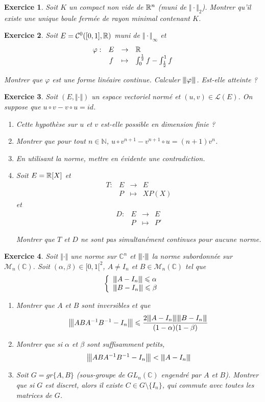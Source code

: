 \documentclass[12pt]{article}
\newtheorem{exercise}{Exercice}[section]
\theoremstyle{remark}
\theoremstyle{remark}
\newcommand{\C}{\mathbb{C}} \newcommand{\Q}{\mathbb{Q}}
\newcommand{\N}{\mathbb{N}} \newcommand{\Z}{\mathbb{Z}}
\newcommand{\M}{\mathcal{M}} \renewcommand{\L}{\mathcal{L}}
\newcommand{\vertiii}[1]{{\left\vert\kern-0.25ex\left\vert\kern-0.25ex\left\vert{}#1
\right\vert\kern-0.25ex\right\vert\kern-0.25ex\right\vert}}
\newcommand{\function}[5]{
	$$
	\begin{array}{rccl}
		#1: & #2 & \to & #3 \\
		& #4 & \mapsto & #5
	\end{array}
	$$
}
\begin{document}
\begin{exercise}
	Soit $K$ un compact non vide de $\mathbb{R}^{n}$ (muni de $\Vert\cdot\Vert_{2}$). Montrer qu'il existe une unique boule fermée de rayon minimal contenant $K$.
\end{exercise}

\begin{exercise}
	Soit $E=\mathcal{C}^{0}([0,1],\mathbb{R})$ muni de $\Vert\cdot\Vert_{\infty}$ et \function{\varphi}{E}{\R}{f}{\int_{0}^{\frac{1}{2}}f-\int_{\frac{1}{2}}^{1}f}
	Montrer que $\varphi$ est une forme linéaire continue. Calculer $\vertiii{\varphi}$. Est-elle atteinte ?
\end{exercise}

\begin{exercise}
	Soit $(E,\Vert\cdot\Vert)$ un espace vectoriel normé et $(u,v)\in\L(E)$. On suppose que $u\circ v-v\circ u=id$.
	\begin{enumerate}
		\item Cette hypothèse sur $u$ et $v$ est-elle possible en dimension finie ?
		\item Montrer que pour tout $n\in\N$, $u\circ v^{n+1}-v^{n+1}\circ u=(n+1)v^{n}$.
		\item En utilisant la norme, mettre en évidente une contradiction.
		\item Soit $E=\mathbb{R}[X]$ et \function{T}{E}{E}{P}{XP(X)} et \function{D}{E}{E}{P}{P'}
		Montrer que $T$ et $D$ ne sont pas simultanément continues pour aucune norme.
	\end{enumerate}
\end{exercise}

\begin{exercise}
	Soit $\Vert\cdot\Vert$ une norme sur $\C^{n}$ et $\vertiii{\cdot}$ la norme subordonnée sur $\M_{n}(\C)$. Soit $(\alpha,\beta)\in[0,1[^{2}$, $A\neq I_{n}$ et $B\in\M_{n}(\C)$ tel que
	$$
	\left\{
		\begin{array}[]{l}
			\vertiii{A-I_{n}}\leqslant\alpha\\
			\vertiii{B-I_{n}}\leqslant\beta
		\end{array}
	\right.
	$$
	\begin{enumerate}
		\item Montrer que $A$ et $B$ sont inversibles et que 
		$$\vertiii{ABA^{-1}B^{-1}-I_{n}}\leqslant\frac{2\vertiii{A-I_{n}}\vertiii{B-I_{n}}}{(1-\alpha)(1-\beta)}$$
		\item Montrer que si $\alpha$ et $\beta$ sont suffisamment petits, 
		$$\vertiii{ABA^{-1}B^{-1}-I_{n}}<\vertiii{A-I_{n}}$$
		\item Soit $G=gr\{A,B\}$ (sous-groupe de $GL_{n}(\C)$ engendré par $A$ et $B$). Montrer que si $G$ est discret, alors il existe $C\in G\setminus\{I_{n}\}$, qui commute avec toutes les matrices de $G$.
	\end{enumerate}
\end{exercise}
\end{document}
